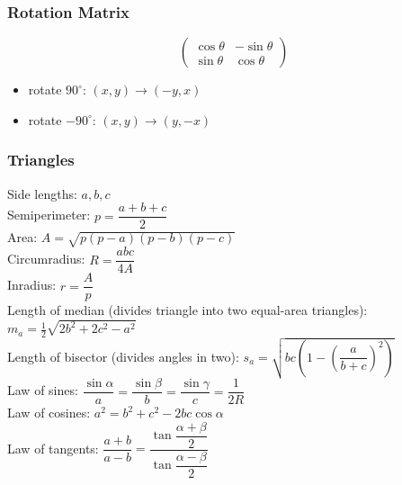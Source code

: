 \subsubsection{Rotation Matrix}

\[ \begin{pmatrix}
    \cos \theta & -\sin \theta \\
    \sin \theta & \cos \theta
\end{pmatrix} \]

\begin{itemize}
    \item rotate $90^\circ$: $(x,y) \to (-y, x)$
    \item rotate $-90^\circ$: $(x,y) \to (y, -x)$
\end{itemize}

\subsubsection{Triangles}
Side lengths: $a,b,c$\\
Semiperimeter: $p=\dfrac{a+b+c}{2}$\\
Area: $A=\sqrt{p(p-a)(p-b)(p-c)}$\\
Circumradius: $R=\dfrac{abc}{4A}$\\
Inradius: $r=\dfrac{A}{p}$\\
Length of median (divides triangle into two equal-area triangles): $m_a=\tfrac{1}{2}\sqrt{2b^2+2c^2-a^2}$\\
Length of bisector (divides angles in two): $s_a=\sqrt{bc\left(1-\left(\dfrac{a}{b+c}\right)^2\right)}$\\
Law of sines: $\dfrac{\sin\alpha}{a}=\dfrac{\sin\beta}{b}=\dfrac{\sin\gamma}{c}=\dfrac{1}{2R}$\\
Law of cosines: $a^2=b^2+c^2-2bc\cos\alpha$\\
Law of tangents: $\dfrac{a+b}{a-b}=\dfrac{\tan\dfrac{\alpha+\beta}{2}}{\tan\dfrac{\alpha-\beta}{2}}$\\

